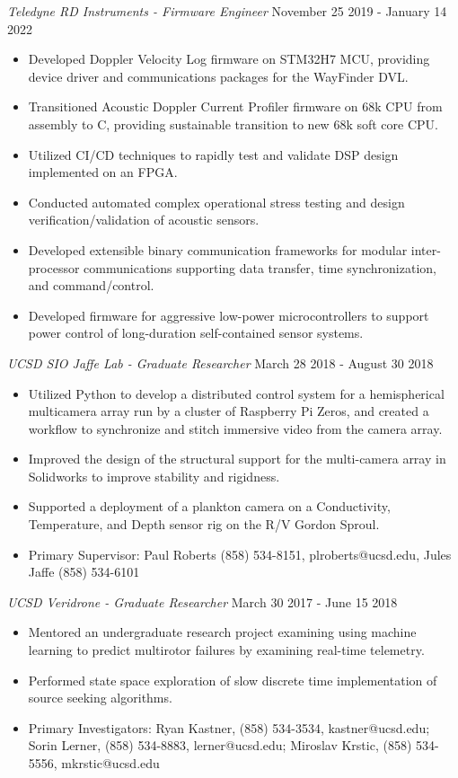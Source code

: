 \documentclass[line,margin]{res}
\begin{document}
\begin{resume}
	{\sl Teledyne RD Instruments - Firmware Engineer} \hfill November 25 2019 - January 14 2022
	\begin{itemize}
		\item Developed Doppler Velocity Log firmware on STM32H7 MCU, providing device driver and communications packages for the WayFinder DVL.
		\item Transitioned Acoustic Doppler Current Profiler firmware on 68k CPU from assembly to C, providing sustainable transition to new 68k soft core CPU.
		\item Utilized CI/CD techniques to rapidly test and validate DSP design implemented on an FPGA.
		\item Conducted automated complex operational stress testing and design verification/validation of acoustic sensors.
		\item Developed extensible binary communication frameworks for modular inter-processor communications supporting data transfer, time synchronization, and command/control.
		\item Developed firmware for aggressive low-power microcontrollers to support power control of long-duration self-contained sensor systems.
	\end{itemize}

	{\sl UCSD SIO Jaffe Lab - Graduate Researcher} \hfill March 28 2018 - August 30 2018
	\begin{itemize}
		\item Utilized Python to develop a distributed control system for a hemispherical multicamera array run by a cluster of Raspberry Pi Zeros, and created a workflow to synchronize and stitch immersive video from the camera array.
		\item Improved the design of the structural support for the multi-camera array in Solidworks to improve stability and rigidness.
		\item Supported a deployment of a plankton camera on a Conductivity, Temperature, and Depth sensor rig on the R/V Gordon Sproul.
		\item Primary Supervisor: Paul Roberts (858) 534-8151, plroberts@ucsd.edu, Jules Jaffe (858) 534-6101
	\end{itemize}

	{\sl UCSD Veridrone - Graduate Researcher} \hfill March 30 2017 - June 15 2018
	\begin{itemize}
		\item Mentored an undergraduate research project examining using machine learning to predict multirotor failures by examining real-time telemetry.
		\item Performed state space exploration of slow discrete time implementation of source seeking algorithms.
		\item Primary Investigators: Ryan Kastner, (858) 534-3534, kastner@ucsd.edu; Sorin Lerner, (858) 534-8883, lerner@ucsd.edu; Miroslav Krstic, (858) 534-5556, mkrstic@ucsd.edu
	\end{itemize}


\end{resume}
\end{document}
